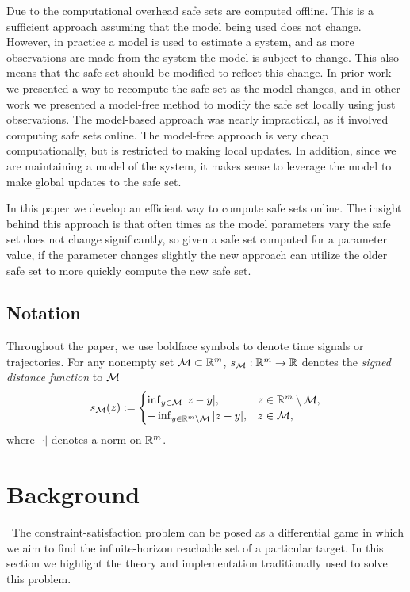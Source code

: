 \documentclass[letterpaper, 10 pt, conference]{ieeeconf}
\begin{document}
Due to the computational overhead safe sets are computed offline. This is a sufficient approach assuming that the model being used does not change. However, in practice a model is used to estimate a system, and as more observations are made from the system the model is subject to change. This also means that the safe set should be modified to reflect this change. In prior work we presented a way to recompute the safe set as the model changes, and in other work we presented a model-free method to modify the safe set locally using just observations. The model-based approach was nearly impractical, as it involved computing safe sets online. The model-free approach is very cheap computationally, but is restricted to making local updates. In addition, since we are maintaining a model of the system, it makes sense to leverage the model to make global updates to the safe set.  

In this paper we develop an efficient way to compute safe sets online. The insight behind this approach is that often times as the model parameters vary the safe set does not change significantly, so given a safe set computed for a parameter value, if the parameter changes slightly the new approach can utilize the older safe set to more quickly compute the new safe set. 

\subsection*{Notation}

Throughout the paper, we use boldface symbols to denote time signals or trajectories.
For any nonempty set $\mathcal{M}\subset\mathbb{R}^m$, $s_{\mathcal{M}}:\mathbb{R}^m\to\mathbb{R}$ denotes the \emph{signed distance function} to $\mathcal{M}$
\[s_{\mathcal{M}}(z) := \begin{cases}\inf_{y\in\mathcal{M}} |z-y|,&z\in\mathbb{R}^m\setminus\mathcal{M}, \\ -\inf_{y\in\mathbb{R}^m\setminus\mathcal{M}} |z-y|,&z\in\mathcal{M},\end{cases}\]
where $|\cdot|$ denotes a norm on $\mathbb{R}^m$.

\section{Background \label{sec:back}} \
The constraint-satisfaction problem can be posed as a differential game in which we aim to find the infinite-horizon reachable set of a particular target. In this section we highlight the theory and implementation traditionally used to solve this problem.

\end{document}
